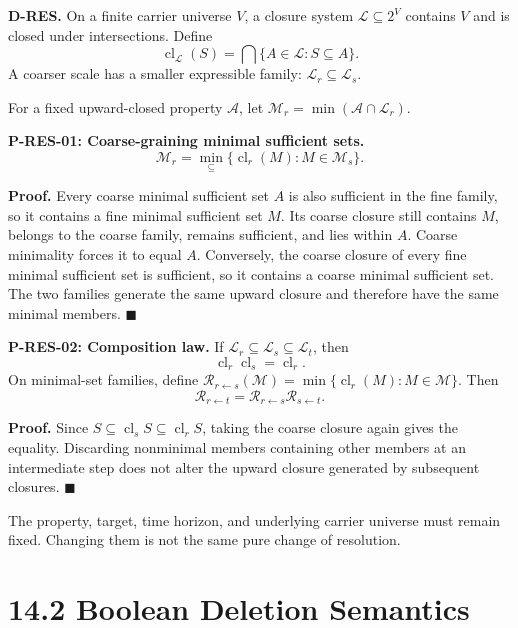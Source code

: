 \documentclass[
  english,
  11pt,
  oneside]{book}
\begin{document}
\textbf{D-RES.} On a finite carrier universe \(V\), a closure system \(\mathcal L\subseteq2^V\) contains \(V\) and is closed under intersections. Define \[\operatorname{cl}_{\mathcal L}(S)=
\bigcap\{A\in\mathcal L:S\subseteq A\}.\] A coarser scale has a smaller expressible family: \(\mathcal L_r\subseteq\mathcal L_s\).

For a fixed upward-closed property \(\mathcal A\), let \(\mathcal M_r=\min(\mathcal A\cap\mathcal L_r)\).

\hypertarget{p-res-01}{}\label{p-res-01}

\textbf{P-RES-01: Coarse-graining minimal sufficient sets.} \[\mathcal M_r=
\min_{\subseteq}\{\operatorname{cl}_r(M):M\in\mathcal M_s\}.\]

\textbf{Proof.} Every coarse minimal sufficient set \(A\) is also sufficient in the fine family, so it contains a fine minimal sufficient set \(M\). Its coarse closure still contains \(M\), belongs to the coarse family, remains sufficient, and lies within \(A\). Coarse minimality forces it to equal \(A\). Conversely, the coarse closure of every fine minimal sufficient set is sufficient, so it contains a coarse minimal sufficient set. The two families generate the same upward closure and therefore have the same minimal members. \(\blacksquare\)

\hypertarget{p-res-02}{}\label{p-res-02}

\textbf{P-RES-02: Composition law.} If \(\mathcal L_r\subseteq\mathcal L_s\subseteq\mathcal L_t\), then \[\operatorname{cl}_r\operatorname{cl}_s=\operatorname{cl}_r.\] On minimal-set families, define \(\mathcal R_{r\leftarrow s}(\mathcal M)=
\min\{\operatorname{cl}_r(M):M\in\mathcal M\}\). Then \[\mathcal R_{r\leftarrow t}
=\mathcal R_{r\leftarrow s}\mathcal R_{s\leftarrow t}.\]

\textbf{Proof.} Since \(S\subseteq\operatorname{cl}_sS\subseteq\operatorname{cl}_rS\), taking the coarse closure again gives the equality. Discarding nonminimal members containing other members at an intermediate step does not alter the upward closure generated by subsequent closures. \(\blacksquare\)

The property, target, time horizon, and underlying carrier universe must remain fixed. Changing them is not the same pure change of resolution.

\section{14.2 Boolean Deletion Semantics}\label{boolean-deletion-semantics}
\end{document}
